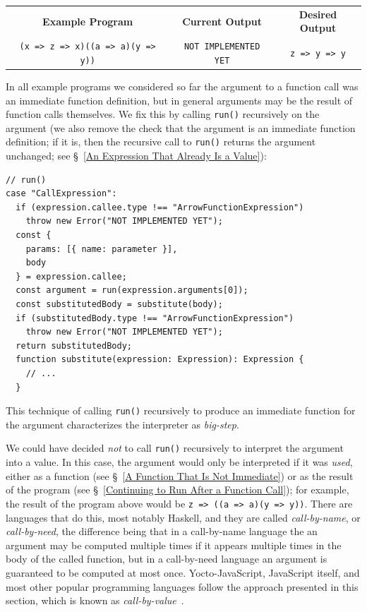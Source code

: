 \documentclass[12pt, oneside]{book}
\begin{document}
\begin{center}
\begin{tabular}{c|c|c}
\textbf{Example Program} & \textbf{Current Output} & \textbf{Desired Output} \\
\texttt{(x => z => x)((a => a)(y => y))} & \texttt{NOT IMPLEMENTED YET} & \texttt{z => y => y} \\
\end{tabular}
\end{center}

In all example programs we considered so far the argument to a function call was an immediate function definition, but in general arguments may be the result of function calls themselves. We fix this by calling \texttt{run()} recursively on the argument (we also remove the check that the argument is an immediate function definition; if it is, then the recursive call to \texttt{run()} returns the argument unchanged; see §~\ref{An Expression That Already Is a Value}):

\begin{verbatim}
// run()
case "CallExpression":
  if (expression.callee.type !== "ArrowFunctionExpression")
    throw new Error("NOT IMPLEMENTED YET");
  const {
    params: [{ name: parameter }],
    body
  } = expression.callee;
  const argument = run(expression.arguments[0]);
  const substitutedBody = substitute(body);
  if (substitutedBody.type !== "ArrowFunctionExpression")
    throw new Error("NOT IMPLEMENTED YET");
  return substitutedBody;
  function substitute(expression: Expression): Expression {
    // ...
  }
\end{verbatim}

\begin{mdframed}[frametitle = {Technical Terms}]
This technique of calling \texttt{run()} recursively to produce an immediate function for the argument characterizes the interpreter as \emph{big-step}.
\end{mdframed}

\begin{mdframed}[frametitle = {Advanced}]
We could have decided \emph{not} to call \texttt{run()} recursively to interpret the argument into a value. In this case, the argument would only be interpreted if it was \emph{used}, either as a function (see §~\ref{A Function That Is Not Immediate}) or as the result of the program (see §~\ref{Continuing to Run After a Function Call}); for example, the result of the program above would be \texttt{z => ((a => a)(y => y))}. There are languages that do this, most notably Haskell, and they are called \emph{call-by-name}, or \emph{call-by-need}, the difference being that in a call-by-name language the an argument may be computed multiple times if it appears multiple times in the body of the called function, but in a call-by-need language an argument is guaranteed to be computed at most once. Yocto-JavaScript, JavaScript itself, and most other popular programming languages follow the approach presented in this section, which is known as \emph{call-by-value}~\cite{call-by-name-call-by-value-and-the-lambda-calculus}.
\end{mdframed}
\end{document}
